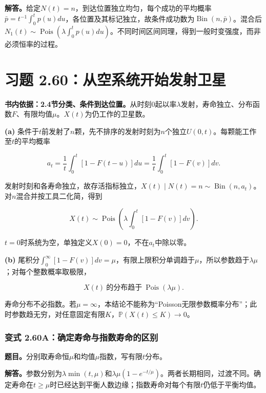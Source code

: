 \documentclass[12pt,a4paper,UTF8,fontset=fandol]{ctexart}
\begin{document}
\textbf{解答。}给定\(N(t)=n\)，到达位置独立均匀，每个成功的平均概率\(\bar p=t^{-1}\int_0^t p(u)du\)，各位置及其标记独立，故条件成功数为\(\operatorname{Bin}(n,\bar p)\)。混合后\(N_1(t)\sim\operatorname{Pois}(\lambda\int_0^t p(u)du)\)。不同时间区间同理，得到一般时变强度，而非必须恒率的过程。

\section{习题
2.60：从空系统开始发射卫星}\label{ux4e60ux9898-2.60ux4eceux7a7aux7cfbux7edfux5f00ux59cbux53d1ux5c04ux536bux661f}

\textbf{书内依据：2.4节分类、条件到达位置。}从时刻0起以率\(\lambda\)发射，寿命独立、分布函数\(F\)、有限均值\(\mu\)。\(X(t)\)为仍工作的卫星数。

\textbf{(a)}
条件于\(t\)前发射了\(n\)颗，先不排序的发射时刻为\(n\)个独立\(U(0,t)\)。每颗能工作至\(t\)的平均概率

\[a_t=\frac1t\int_0^t[1-F(t-u)]du
=\frac1t\int_0^t[1-F(v)]dv.\]

发射时刻和各寿命独立，故存活指标独立，\(X(t)\mid N(t)=n\sim\operatorname{Bin}(n,a_t)\)。对\(n\)混合并按工具二化简，得到

\[\boxed{X(t)\sim\operatorname{Pois}\left(\lambda\int_0^t[1-F(v)]dv\right).}\]

\(t=0\)时系统为空，单独定义\(X(0)=0\)，不在\(a_t\)中除以零。

\textbf{(b)}
尾积分\(\int_0^\infty[1-F(v)]dv=\mu\)，有限上限积分单调趋于\(\mu\)，所以参数趋于\(\lambda\mu\)；对每个整数概率取极限，

\[\boxed{X(t)\ \text{的分布趋于}\ \operatorname{Pois}(\lambda\mu).}\]

寿命分布不必指数。若\(\mu=\infty\)，本结论不能称为``Poisson无限参数概率分布''；此时参数趋无穷，对任意固定有限\(K\)，\(\mathbb P(X(t)\le K)\to0\)。

\subsubsection{变式
2.60A：确定寿命与指数寿命的区别}\label{ux53d8ux5f0f-2.60aux786eux5b9aux5bffux547dux4e0eux6307ux6570ux5bffux547dux7684ux533aux522b}

\textbf{题目。}分别取寿命恒\(\mu\)和均值\(\mu\)指数，写有限\(t\)分布。

\textbf{解答。}参数分别为\(\lambda\min(t,\mu)\)和\(\lambda\mu(1-e^{-t/\mu})\)。两者长期相同，过渡不同。确定寿命在\(t\ge\mu\)时已经达到平衡人数边缘；指数寿命对每个有限\(t\)仍低于平衡均值。
\end{document}
